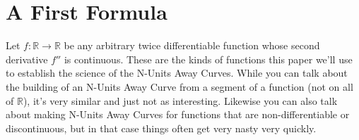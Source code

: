 \newcommand{\firstFormula}{

\begin{equation}
    f_N(t) = \begin{bmatrix}
        x_N(t) \\ y_N(t)
    \end{bmatrix} =
    \begin{cases}
        \begin{bmatrix}
            t - \dfrac{f'(x_o)}{|f`(x_o)|} N cos (tan^{-1} \left( -\dfrac{1}{f'(x_o)} \right) ) \\
            f(t) - - \dfrac{f'(x_o)}{|f`(x_o)|} N sin (tan^{-1} \left( -\dfrac{1}{f'(x_o)} \right) )
        \end{bmatrix}, & t \ni f'(t) \neq 0 \\
        \begin{bmatrix}
            t \\ f(t) + N
        \end{bmatrix}, & t \ni f'(t) = 0
    \end{cases}
\end{equation}

}

\section{A First Formula}

Let $f: \mathbb{R} \to \mathbb{R}$ be any arbitrary twice differentiable function whose second derivative $f''$
is continuous. These are the kinds of functions this paper we’ll use to establish the science of the N-Units Away Curves. While you can talk about the building of an N-Units Away Curve from a segment of a function (not on all of $\mathbb{R}$), it’s very similar and just not as interesting. Likewise you can also talk about making N-Units Away Curves for functions that are non-differentiable or discontinuous, but in that case things often get very nasty very quickly.

